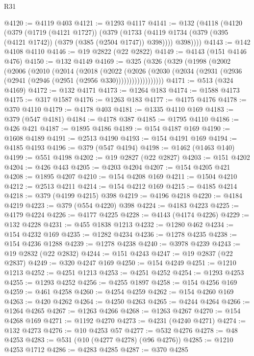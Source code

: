 \begin{lexlean}{R31}
\begin{coremodule}
@4120 := @4119 @403
@4121 := @1293 @4117
@4141 := @132
    (@4118
      (@4120
        (@379
          (@1719 (@4121 @1727))
          (@379
            (@1733 (@4119 @1734 (@379 (@395 (@4121 @1742)) (@379 (@385 (@2504 @1747)) @398))))
            @398))))
@4143 := @142 @4108 @4110
@4146 := @19 @2822 (@22 @2822)
@4149 := @4143 (@151 @4146 @476)
@4150 := @132 @4149
@4169 := @325
    (@326
      (@329
        (@1998
          (@2002
            (@2006
              (@2010
                (@2014
                  (@2018
                    (@2022
                      (@2026
                        (@2030
                          (@2034 (@2931 (@2936 (@2941 (@2946 (@2951 (@2956 @330))))))))))))))))))
@4171 := @513 (@324 @4169)
@4172 := @132 @4171
@4173 := @1264 @183
@4174 := @1588 @4173
@4175 := @317 @1587
@4176 := @1263 @183
@4177 := @4175 @4176
@4178 := @370 @4110
@4179 := @4178 @403
@4181 := @1335 @4110 @169
@4183 := @379 (@547 @4181)
@4184 := @4178 @387
@4185 := @1795 @4110
@4186 := @426 @421
@4187 := @1895 @4186
@4189 := @154 @4187 @169
@4190 := @1608 @4189
@4191 := @2513 @4190
@4193 := @154 @4191 @169
@4194 := @4185 @4193
@4196 := @379 (@547 @4194)
@4198 := @1462 (@1463 @140)
@4199 := @551 @4198
@4202 := @19 @2827 (@22 @2827)
@4203 := @151 @4202
@4204 := @426 @443
@4205 := @4203 @4204
@4207 := @154 @4205 @421
@4208 := @1895 @4207
@4210 := @154 @4208 @169
@4211 := @1504 @4210
@4212 := @2513 @4211
@4214 := @154 @4212 @169
@4215 := @4185 @4214
@4218 := @379 (@4199 @4215) @398
@4219 := @4196 @4218
@4220 := @4184 @4219
@4223 := @379 (@554 @4220) @398
@4224 := @4183 @4223
@4225 := @4179 @4224
@4226 := @4177 @4225
@4228 := @4143 (@4174 @4226)
@4229 := @132 @4228
@4231 := @455 @1838 @1213
@4232 := @1280 @462
@4234 := @154 @4232 @169
@4235 := @1282 @4234
@4236 := @1278 @4235
@4238 := @154 @4236 @1288
@4239 := @1278 @4238
@4240 := @3978 @4239
@4243 := @19 @2832 (@22 @2832)
@4244 := @151 @4243
@4247 := @19 @2837 (@22 @2837)
@4249 := @320 @4247 @169
@4250 := @154 @4249
@4251 := @1210 @1213
@4252 := @4251 @1213
@4253 := @4251 @4252
@4254 := @1293 @4253
@4255 := @1293 @4252
@4256 := @4255 @1897
@4258 := @154 @4256 @169
@4259 := @461 @4258
@4260 := @4254 @4259
@4262 := @154 @4260 @169
@4263 := @420 @4262
@4264 := @4250 @4263
@4265 := @4244 @4264
@4266 := @1264 @4265
@4267 := @1263 @4266
@4268 := @1263 @4267
@4270 := @154 @4268 @169
@4271 := @1192 @4270
@4273 := @4231 (@4240 @4271)
@4274 := @132 @4273
@4276 := @10 @4253 @57
@4277 := @532 @4276
@4278 := @48 @4253
@4283 := @531 (@10 (@4277 @4278) (@96 @4276))
@4285 := @1210 @4253 @1712
@4286 := @4283 @4285
@4287 := @370 @4285

\end{coremodule}
\end{lexlean}
